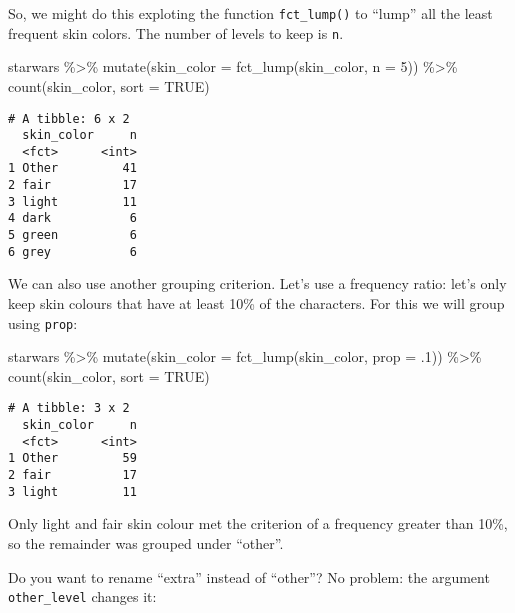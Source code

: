 \documentclass[
]{article}
\newenvironment{Shaded}{\begin{snugshade}}{\end{snugshade}}
\newcommand{\AttributeTok}[1]{\textcolor[rgb]{0.77,0.63,0.00}{#1}}
\newcommand{\ConstantTok}[1]{\textcolor[rgb]{0.00,0.00,0.00}{#1}}
\newcommand{\DecValTok}[1]{\textcolor[rgb]{0.00,0.00,0.81}{#1}}
\newcommand{\FunctionTok}[1]{\textcolor[rgb]{0.00,0.00,0.00}{#1}}
\newcommand{\NormalTok}[1]{#1}
\newcommand{\SpecialCharTok}[1]{\textcolor[rgb]{0.00,0.00,0.00}{#1}}
\begin{document}
So, we might do this exploting the function \texttt{fct\_lump()} to
``lump'' all the least frequent skin colors. The number of levels to
keep is \texttt{n}.

\begin{Shaded}
\begin{Highlighting}[]
\NormalTok{starwars }\SpecialCharTok{\%\textgreater{}\%}
  \FunctionTok{mutate}\NormalTok{(}\AttributeTok{skin\_color =} \FunctionTok{fct\_lump}\NormalTok{(skin\_color, }\AttributeTok{n =} \DecValTok{5}\NormalTok{)) }\SpecialCharTok{\%\textgreater{}\%}
  \FunctionTok{count}\NormalTok{(skin\_color, }\AttributeTok{sort =} \ConstantTok{TRUE}\NormalTok{)}
\end{Highlighting}
\end{Shaded}

\begin{verbatim}
# A tibble: 6 x 2
  skin_color     n
  <fct>      <int>
1 Other         41
2 fair          17
3 light         11
4 dark           6
5 green          6
6 grey           6
\end{verbatim}

We can also use another grouping criterion. Let's use a frequency ratio:
let's only keep skin colours that have at least 10\% of the characters.
For this we will group using \texttt{prop}:

\begin{Shaded}
\begin{Highlighting}[]
\NormalTok{starwars }\SpecialCharTok{\%\textgreater{}\%}
  \FunctionTok{mutate}\NormalTok{(}\AttributeTok{skin\_color =} \FunctionTok{fct\_lump}\NormalTok{(skin\_color, }\AttributeTok{prop =}\NormalTok{ .}\DecValTok{1}\NormalTok{)) }\SpecialCharTok{\%\textgreater{}\%}
  \FunctionTok{count}\NormalTok{(skin\_color, }\AttributeTok{sort =} \ConstantTok{TRUE}\NormalTok{)}
\end{Highlighting}
\end{Shaded}

\begin{verbatim}
# A tibble: 3 x 2
  skin_color     n
  <fct>      <int>
1 Other         59
2 fair          17
3 light         11
\end{verbatim}

Only light and fair skin colour met the criterion of a frequency greater
than 10\%, so the remainder was grouped under ``other''.

Do you want to rename ``extra'' instead of ``other''? No problem: the
argument \texttt{other\_level} changes it:
\end{document}
